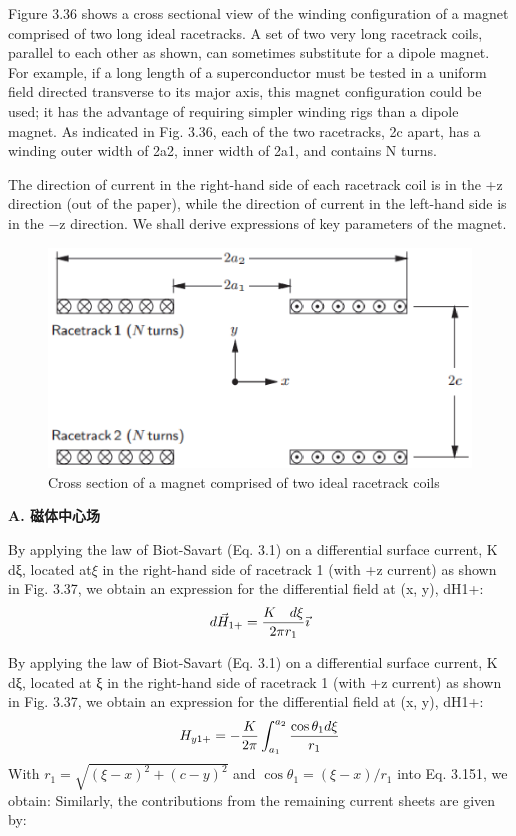 Figure 3.36 shows a cross sectional view of the winding configuration of a magnet
comprised of two long ideal racetracks. A set of two very long racetrack coils,
parallel to each other as shown, can sometimes substitute for a dipole magnet.
For example, if a long length of a superconductor must be tested in a uniform field
directed transverse to its major axis, this magnet configuration could be used; it
has the advantage of requiring simpler winding rigs than a dipole magnet. As
indicated in Fig. 3.36, each of the two racetracks, 2c apart, has a winding outer
width of 2a2, inner width of 2a1, and contains N turns.

The direction of current in the right-hand side of each racetrack coil is in the +z
direction (out of the paper), while the direction of current in the left-hand side is
in the −z direction. We shall derive expressions of key parameters of the magnet.

\begin{figure}[htbp]
	\centering
	\includegraphics[scale=0.5]{chpt3/figs/fig3.36.eps}
	\caption{Cross section of a magnet comprised of two ideal racetrack coils}
\end{figure}

\textbf{A. 磁体中心场}

By applying the law of Biot-Savart (Eq. 3.1) on a differential surface current, K dξ,
located at$\xi$ in the right-hand side of racetrack 1 (with +z current) as shown in
Fig. 3.37, we obtain an expression for the differential field at (x, y), dH1+:
$$
d\vec{H}_{1+}=\frac{K\quad d\xi}{2\pi r_{1}}\vec{\imath}\\%
$$

By applying the law of Biot-Savart (Eq. 3.1) on a differential surface current, K dξ,
located at ξ in the right-hand side of racetrack 1 (with +z current) as shown in
Fig. 3.37, we obtain an expression for the differential field at (x, y), dH1+:
$$
H_{y1+}=-\frac{K}{2\pi}\int_{a_{1}}^{a_{2}}\frac{\cos\theta_{1}d\xi}{r_{1}}\\%
$$
With $r_1=\sqrt{(\xi−x)^2+(c−y)^2}$ and $\cos\theta_1=(\xi−x)/r_1$ into Eq. 3.151, we obtain:
Similarly, the contributions from the remaining current sheets are given by:

